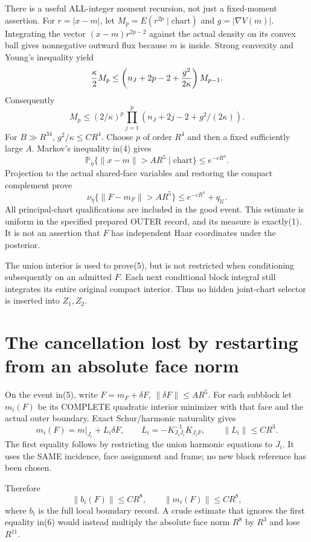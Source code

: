 \documentclass{article}
\begin{document}
There is a useful ALL-integer moment recursion, not just a fixed-moment assertion. For $r=|x-m|$, let $M_p=E(r^{2p}\mid\text{chart})$ and $g=|\nabla V(m)|$. Integrating the vector $(x-m)r^{2p-2}$ against the actual density on its convex ball gives nonnegative outward flux because $m$ is inside. Strong convexity and Young's inequality yield
\[
 {\kappa\over2}M_p
 \le\left(n_J+2p-2+{g^2\over2\kappa}\right)M_{p-1}.
\]
Consequently
\[
 M_p\le(2/\kappa)^p\prod_{j=1}^p
            \left(n_J+2j-2+g^2/(2\kappa)\right).       \tag{4}
\]
For $B\gg R^{34}$, $g^2/\kappa\le CR^4$. Choose $p$ of order $R^4$ and then a fixed sufficiently large $A$. Markov's inequality in(4) gives
\[
 \mathbb P_\eta\{\|x-m\|>A R^5\mid\text{chart}\}
       \le e^{-cR^4}.
\]
Projection to the actual shared-face variables and restoring the compact complement prove
\[
 \nu_\eta\{\|F-m_F\|>A R^5\}
       \le e^{-cR^4}+q_{\mathcal U}.                 \tag{5}
\]
All principal-chart qualifications are included in the good event. This estimate is uniform in the specified prepared OUTER record, and its measure is exactly(1). It is not an assertion that $F$ has independent Haar coordinates under the posterior.

The union interior is used to prove(5), but is not restricted when conditioning subsequently on an admitted $F$. Each next conditional block integral still integrates its entire original compact interior. Thus no hidden joint-chart selector is inserted into $Z_1,Z_2$.

\section*{The cancellation lost by restarting from an absolute face norm}
On the event in(5), write $F=m_F+\delta F$, $\|\delta F\|\le AR^5$. For each subblock let $m_i(F)$ be its COMPLETE quadratic interior minimizer with that face and the actual outer boundary. Exact Schur/harmonic naturality gives
\[
 m_i(F)=m|_{J_i}+L_i\delta F,\qquad
 L_i=-K_{J_iJ_i}^{-1}K_{J_iF},\qquad \|L_i\|\le CR^3. \tag{6}
\]
The first equality follows by restricting the union harmonic equations to $J_i$. It uses the SAME incidence, face assignment and frame; no new block reference has been chosen.

Therefore
\[
 \|b_i(F)\|\le CR^8,\qquad \|m_i(F)\|\le CR^8,         \tag{7}
\]
where $b_i$ is the full local boundary record. A crude estimate that ignores the first equality in(6) would instead multiply the absolute face norm $R^8$ by $R^3$ and lose $R^{11}$.
\end{document}
